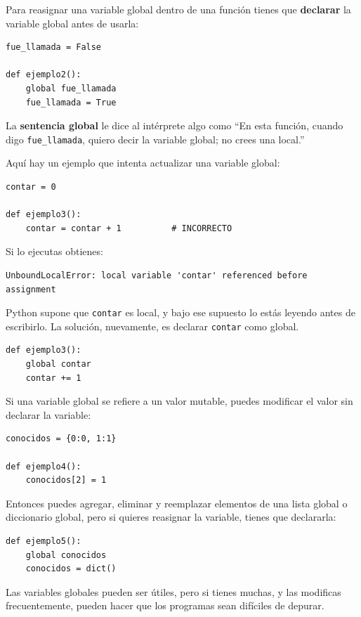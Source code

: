 \documentclass[10pt]{book}
\begin{document}
Para reasignar una variable global dentro de una función tienes que
{\bf declarar} la variable global antes de usarla:

\begin{verbatim}
fue_llamada = False

def ejemplo2():
    global fue_llamada
    fue_llamada = True
\end{verbatim}
%
La {\bf sentencia global} le dice al intérprete
algo como ``En esta función, cuando digo \verb"fue_llamada",
quiero decir la variable global; no crees una local.''

Aquí hay un ejemplo que intenta actualizar una variable global:

\begin{verbatim}
contar = 0

def ejemplo3():
    contar = contar + 1          # INCORRECTO
\end{verbatim}
%
Si lo ejecutas obtienes:

\begin{verbatim}
UnboundLocalError: local variable 'contar' referenced before assignment
\end{verbatim}
%
Python supone que {\tt contar} es local, y bajo ese supuesto
lo estás leyendo antes de escribirlo.  La solución, nuevamente,
es declarar {\tt contar} como global.

\begin{verbatim}
def ejemplo3():
    global contar
    contar += 1
\end{verbatim}
%
Si una variable global se refiere a un valor mutable, puedes modificar
el valor sin declarar la variable:

\begin{verbatim}
conocidos = {0:0, 1:1}

def ejemplo4():
    conocidos[2] = 1
\end{verbatim}
%
Entonces puedes agregar, eliminar y reemplazar elementos de una lista global o diccionario
global, pero si quieres reasignar la variable,
tienes que declararla:

\begin{verbatim}
def ejemplo5():
    global conocidos
    conocidos = dict()
\end{verbatim}
%
Las variables globales pueden ser útiles, pero si tienes muchas,
y las modificas frecuentemente, pueden hacer que los programas sean
difíciles de depurar.
\end{document}
